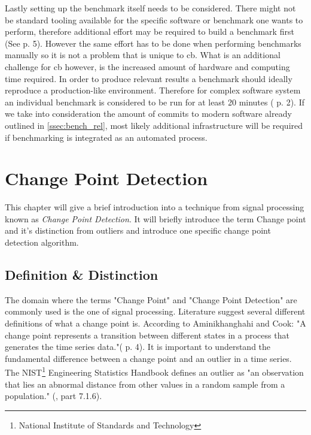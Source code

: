 \documentclass[	runningheads,
				a4paper]{llncs}
\begin{document}
	Lastly setting up the benchmark itself needs to be considered. There might not be standard tooling available for the specific software or benchmark one wants to perform, therefore additional effort may be required to build a benchmark first (See \cite{grambow2019} p. 5). However the same effort has to be done when performing benchmarks manually so it is not a problem that is unique to \gls{cb}. What is an additional challenge for \gls{cb} however, is the increased amount of hardware and computing time required. In order to produce relevant results a benchmark should ideally reproduce a production-like environment. Therefore for complex software system an individual benchmark is considered to be run for at least 20 minutes (\cite{grambow2019} p. 2). If we take into consideration the amount of commits to modern software already outlined in \autoref{ssec:bench_rel}, most likely additional infrastructure will be required if benchmarking is integrated as an automated process. 

	\section{Change Point Detection}
	\label{sec:cp_detection}
	This chapter will give a brief introduction into a technique from signal processing known as \textit{Change Point Detection}. It will briefly introduce the term Change point and it's distinction from outliers and introduce one specific change point detection algorithm. 
	
	\subsection{Definition \& Distinction}
	\label{ssec:cp_distinction}
	The domain where the terms "Change Point" and "Change Point Detection" are commonly used is the one of signal processing. Literature suggest several different definitions of what a change point is.  According to Aminikhanghahi and Cook: "A change point represents a transition between different states in a process that generates the time series data."(\cite{Samaneh2016} p. 4). It is important to understand the fundamental difference between a change point and an outlier in a time series. The NIST\footnote{National Institute of Standards and Technology} Engineering Statistics Handbook defines an outlier as "an observation that lies an abnormal distance from other values in a random sample from a population." (\cite{nist}, part 7.1.6). 
\end{document}

